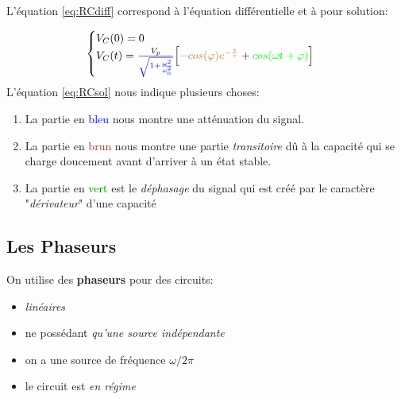 \documentclass{report}
\begin{document}
L'équation \ref{eq:RCdiff} correspond à l'équation différentielle et à pour solution:

\begin{equation} 
\begin{cases}
V_C(0) = 0\\
V_C(t) = \frac{V_p}{\textcolor{blue}{\sqrt{1 + \frac{\omega^2}{\omega_0^2}}}} \Bigl[\textcolor{brown}{-cos(\varphi)e^{-\frac{t}{\tau}}} + \textcolor{green}{cos(\omega t + \varphi)} \Bigl] \label{eq:RCsol}
\end{cases} 
\end{equation}
L'équation \ref{eq:RCsol} nous indique plusieurs choses:
\begin{enumerate}
\item La partie en \textcolor{blue}{bleu} nous montre une atténuation du signal.
\item La partie en \textcolor{brown}{brun} nous montre une partie \textit{transitoire} dû à la capacité qui se charge doucement avant d'arriver à un état stable.
\item La partie en \textcolor{green}{vert} est le \textit{déphasage} du signal qui est créé par le caractère "\textit{dérivateur}" d'une capacité
\end{enumerate}


\subsection{Les Phaseurs}
On utilise des \textbf{phaseurs} pour des circuits:
\begin{itemize}
\item \textit{linéaires}
\item  ne possédant \textit{qu'une source indépendante}
\item on a une source de fréquence $\omega/ 2\pi$
\item le circuit est \textit{en régime}
\end{itemize}
\end{document}
